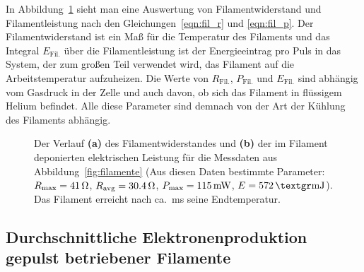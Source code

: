 In Abbildung~\ref{fig:filament_puls} sieht man eine Auswertung von Filamentwiderstand und Filamentleistung nach den Gleichungen~\eqref{eqn:fil_r} und \eqref{eqn:fil_p}. Der Filamentwiderstand ist ein Maß für die Temperatur des Filaments und das Integral $E_\text{Fil.}$ über die Filamentleistung ist der Energieeintrag pro Puls in das System, der zum großen Teil verwendet wird, das Filament auf die Arbeitstemperatur aufzuheizen. Die Werte von $R_\text{Fil.}$, $P_\text{Fil.}$ und $E_\text{Fil.}$ sind abhängig vom Gasdruck in der Zelle und auch davon, ob sich das Filament in flüssigem Helium befindet. Alle diese Parameter sind demnach von der Art der Kühlung des Filaments abhängig.

\begin{figure}[h!tbp]
	\centerline{%
	}
	\caption[Verlauf von Widerstand und deponierter Leistung am Filament]{Der Verlauf {\bfseries (a)} des Filamentwiderstandes und {\bfseries (b)} der im Filament deponierten elektrischen Leistung für die Messdaten aus Abbildung~\ref{fig:filamente} (Aus diesen Daten bestimmte Parameter: $R_\text{max}=\unit[41]{\Omega}$, $R_\text{avg} = \unit[30.4]{\Omega}$, $P_\text{max}=\unit[115]{mW}$, $E=\unit[572]{\grmu J}$). Das Filament erreicht nach ca.\ \unit[10]{ms} seine Endtemperatur. }
	\label{fig:filament_puls}
\end{figure}

\subsection{Durchschnittliche Elektronenproduktion gepulst betriebener Filamente}
\label{ssec:electron_production}

